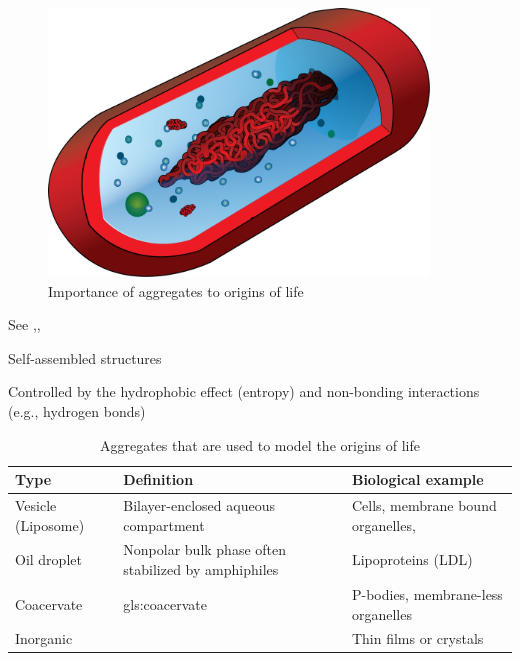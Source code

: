 \documentclass[]{article}
\begin{document}
\begin{figure}[H]
	\caption{Importance of aggregates to origins of life}\label{fig:ImportanceOfAggregation}
	\includegraphics[width=0.9\textwidth]{ImportanceOfAggregation}
\end{figure}

See  \cite{deamer2017role},\cite{maurer2011primitive}, \cite{segre2001lipid}

Self-assembled structures

Controlled by the hydrophobic effect (entropy) and non-bonding interactions (e.g., hydrogen bonds)

\begin{table}[H]
	\caption{Aggregates that are used to model the origins of life}
	\begin{tabular}{l|p{4cm}|p{3cm}} \hline
		Type & Definition &Biological example\\ \hline
		Vesicle (Liposome)& Bilayer-enclosed aqueous compartment& Cells, membrane bound organelles,\\ \hline
		Oil droplet&
		Nonpolar bulk phase often stabilized by
		amphiphiles&
		Lipoproteins (LDL)\\ \hline
		Coacervate&
		\glsdesc{gls:coacervate}&
		P-bodies, membrane-less organelles\\ \hline
		Inorganic&&Thin films or crystals\\ \hline
	\end{tabular}
\end{table}
\end{document}
